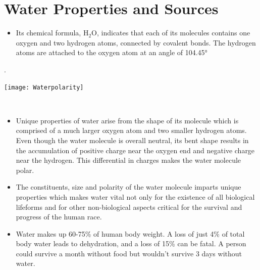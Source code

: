 \chapter{Water Properties and Sources}

\begin{minipage}{.7\textwidth} 
\begin{itemize}
\item Its chemical formula, H$_2$O, indicates that each of its molecules contains one oxygen and two hydrogen atoms, connected by covalent bonds. The hydrogen atoms are attached to the oxygen atom at an angle of 104.45\si{\degree}
\end{itemize}.
    \end{minipage}%
        \begin{minipage}{0.3\textwidth}
        \centering
        \texttt{[image: Waterpolarity]}
    \end{minipage}\\
\vspace{0.5cm}
\begin{itemize}
\item Unique properties of water arise from the shape of its molecule which is comprised of a much larger oxygen atom and two smaller hydrogen atoms.  Even though the water molecule is overall neutral, its bent shape results in the accumulation of positive charge near the oxygen end and negative charge near the hydrogen.  This differential in charges makes the water molecule polar. 

\item The constituents, size and polarity of the water molecule imparts unique properties which makes water vital not only for the existence of all biological lifeforms and for other non-biological aspects critical for the survival and progress of the human race.

\item Water makes up 60-75\% of human body weight. A loss of just 4\% of total body water leads to dehydration, and a loss of 15\% can be fatal. A person could survive a month without food but wouldn’t survive 3 days without water.\\
\end{itemize}

